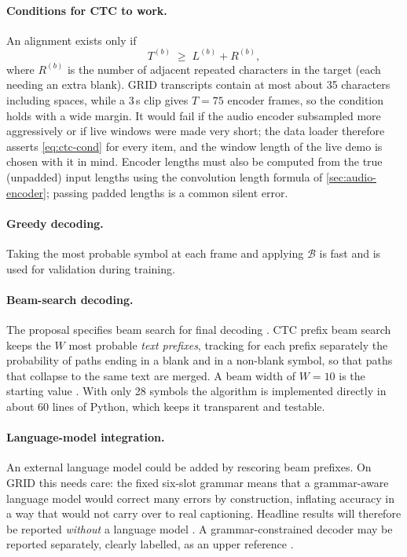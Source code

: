 \paragraph{Conditions for CTC to work.} An alignment exists only if
\begin{equation}
T^{(b)} \;\ge\; L^{(b)} + R^{(b)},
\label{eq:ctc-cond}
\end{equation}
where $R^{(b)}$ is the number of adjacent repeated characters in the target (each
needing an extra blank). GRID transcripts contain at most about 35 characters
including spaces, while a 3\,s clip gives $T=75$ encoder frames, so the condition
holds with a wide margin. It would fail if the audio encoder subsampled more
aggressively or if live windows were made very short; the data loader therefore
asserts \cref{eq:ctc-cond} for every item, and the window length of the live
demo is chosen with it in mind. Encoder lengths must also be computed from the
true (unpadded) input lengths using the convolution length formula of
\cref{sec:audio-encoder}; passing padded lengths is a common silent error.

\paragraph{Greedy decoding.} Taking the most probable symbol at each frame and
applying $\mathcal{B}$ is fast and is used for validation during training.

\paragraph{Beam-search decoding.} The proposal specifies beam search for final
decoding \spec. CTC prefix beam search keeps the $W$ most probable \emph{text
prefixes}, tracking for each prefix separately the probability of paths ending
in a blank and in a non-blank symbol, so that paths that collapse to the same
text are merged. A beam width of $W=10$ is the starting value \rec. With only
28 symbols the algorithm is implemented directly in about 60 lines of Python,
which keeps it transparent and testable.

\paragraph{Language-model integration.} An external language model could be added
by rescoring beam prefixes. On GRID this needs care: the fixed six-slot grammar
means that a grammar-aware language model would correct many errors by
construction, inflating accuracy in a way that would not carry over to real
captioning. Headline results will therefore be reported \emph{without} a
language model \rec. A grammar-constrained decoder may be reported separately,
clearly labelled, as an upper reference \tbd.

